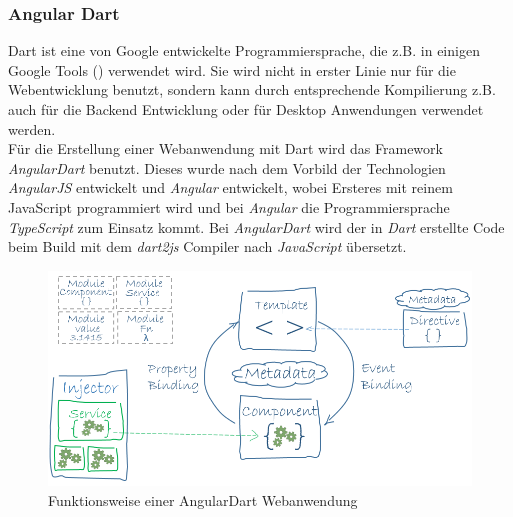\subsubsection{Angular Dart}
\label{sec:angulardart}

Dart ist eine von Google entwickelte Programmiersprache, die z.B. in einigen Google Tools () verwendet wird. Sie wird nicht in erster Linie nur für die Webentwicklung benutzt, sondern kann durch entsprechende Kompilierung z.B. auch für die Backend Entwicklung oder für Desktop Anwendungen  verwendet werden.\cite{angularDart}\cite{dart2015}\\

Für die Erstellung einer Webanwendung mit Dart wird das Framework \textit{AngularDart}  benutzt. Dieses wurde nach dem Vorbild der Technologien \textit{AngularJS} entwickelt und \textit{Angular} entwickelt, wobei Ersteres mit reinem JavaScript programmiert wird und bei \textit{Angular} die Programmiersprache \textit{TypeScript} zum Einsatz kommt. Bei \textit{AngularDart} wird der in \textit{Dart} erstellte Code beim Build mit dem \textit{dart2js} Compiler nach \textit{JavaScript} übersetzt.\\

\begin{figure}[h!]
	\centering
	\includegraphics[width=.8\linewidth]{figures/angulardart}
	\caption{Funktionsweise einer AngularDart Webanwendung\cite{angularDart}}
	\label{fig:angulardart}
\end{figure}

